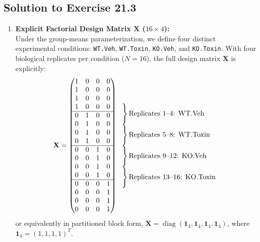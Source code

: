 \documentclass[11pt,twoside,openright]{book}
\begin{document}
\subsection*{Solution to Exercise 21.3}
\begin{enumerate}
    \item \textbf{Explicit Factorial Design Matrix $\mathbf{X}$ ($16 \times 4$):}\\
    Under the group-means parameterization, we define four distinct experimental conditions: \texttt{WT.Veh}, \texttt{WT.Toxin}, \texttt{KO.Veh}, and \texttt{KO.Toxin}. With four biological replicates per condition ($N = 16$), the full design matrix $\mathbf{X}$ is explicitly:
    $$\mathbf{X} = \begin{pmatrix}
    1 & 0 & 0 & 0 \\
    1 & 0 & 0 & 0 \\
    1 & 0 & 0 & 0 \\
    1 & 0 & 0 & 0 \\
    \hline
    0 & 1 & 0 & 0 \\
    0 & 1 & 0 & 0 \\
    0 & 1 & 0 & 0 \\
    0 & 1 & 0 & 0 \\
    \hline
    0 & 0 & 1 & 0 \\
    0 & 0 & 1 & 0 \\
    0 & 0 & 1 & 0 \\
    0 & 0 & 1 & 0 \\
    \hline
    0 & 0 & 0 & 1 \\
    0 & 0 & 0 & 1 \\
    0 & 0 & 0 & 1 \\
    0 & 0 & 0 & 1
    \end{pmatrix} 
    \begin{array}{l}
    \left.\rule{0pt}{16pt}\right\} \text{Replicates 1--4: WT.Veh} \\
    \left.\rule{0pt}{16pt}\right\} \text{Replicates 5--8: WT.Toxin} \\
    \left.\rule{0pt}{16pt}\right\} \text{Replicates 9--12: KO.Veh} \\
    \left.\rule{0pt}{16pt}\right\} \text{Replicates 13--16: KO.Toxin}
    \end{array}$$
    or equivalently in partitioned block form, $\mathbf{X} = \operatorname{diag}(\mathbf{1}_4, \mathbf{1}_4, \mathbf{1}_4, \mathbf{1}_4)$, where $\mathbf{1}_4 = (1, 1, 1, 1)^T$.
    

\end{enumerate}
\end{document}
